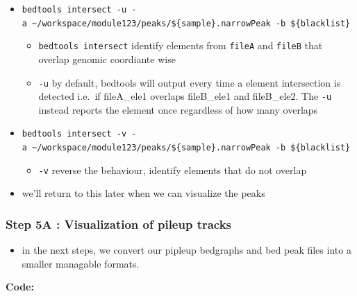 \documentclass[
]{book}
\providecommand{\tightlist}{%
  \setlength{\itemsep}{0pt}\setlength{\parskip}{0pt}}
\begin{document}
\begin{itemize}
\tightlist
\item
  \texttt{bedtools\ intersect\ -u\ -a\ \textasciitilde{}/workspace/module123/peaks/\$\{sample\}.narrowPeak\ -b\ \$\{blacklist\}}

  \begin{itemize}
  \tightlist
  \item
    \texttt{bedtools\ intersect} identify elements from \texttt{fileA} and \texttt{fileB} that overlap genomic coordiante wise
  \item
    \texttt{-u} by default, bedtools will output every time a element intersection is detected i.e.~if fileA\_ele1 overlaps fileB\_ele1 and fileB\_ele2. The \texttt{-u} instead reports the element once regardless of how many overlaps
  \end{itemize}
\item
  \texttt{bedtools\ intersect\ -v\ -a\ \textasciitilde{}/workspace/module123/peaks/\$\{sample\}.narrowPeak\ -b\ \$\{blacklist\}}

  \begin{itemize}
  \tightlist
  \item
    \texttt{-v} reverse the behaviour, identify elements that do not overlap
  \end{itemize}
\item
  we'll return to this later when we can visualize the peaks
\end{itemize}

\subsubsection{Step 5A : Visualization of pileup tracks}\label{step-5a-visualization-of-pileup-tracks}

\begin{itemize}
\tightlist
\item
  in the next steps, we convert our pipleup bedgraphs and bed peak files into a smaller managable formats.
\end{itemize}

\textbf{Code:}
\end{document}
